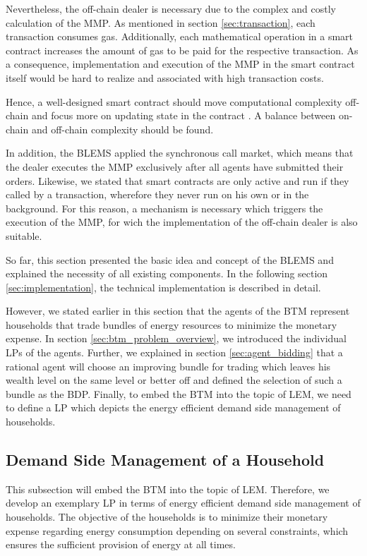 Nevertheless, the off-chain dealer is necessary due to the complex and costly calculation of the MMP.
As mentioned in section \ref{sec:transaction}, each transaction consumes gas. Additionally, each mathematical operation in a smart contract
increases the amount of gas to be paid for the respective transaction. As a consequence, implementation and execution of the MMP
in the smart contract itself would be hard to realize and associated with high transaction costs. 

Hence, a well-designed smart contract should move computational complexity off-chain
and focus more on updating state in the contract . A balance between on-chain
and off-chain complexity should be found.

In addition, the BLEMS applied the synchronous call market, which means that the dealer executes the MMP exclusively after all agents 
have submitted their orders.
Likewise, we stated that smart contracts are only active and run if they called by a transaction,
wherefore they never run on his own or in the background.
For this reason, a mechanism is necessary which triggers the execution of the 
MMP, for wich the implementation of the off-chain dealer is also suitable.

So far, this section presented the basic idea and concept of the BLEMS
and explained the necessity of all existing components. In the following section \ref{sec:implementation}, 
the technical implementation is described in detail. 

However, we stated earlier in this section that the agents of the BTM represent households
that trade bundles of energy resources to minimize the monetary expense. 
In section \ref{sec:btm_problem_overview}, we introduced the individual LPs of the agents.
Further, we explained in section \ref{sec:agent_bidding} that a rational agent will choose an improving bundle for 
trading which leaves his wealth level on the same level or better off and defined the selection of such a bundle 
as the BDP.
Finally, to embed the BTM into the topic of LEM, we need to define 
a LP which depicts the energy efficient demand side management of households.

\subsection{Demand Side Management of a Household}
This subsection will embed the BTM into the topic of LEM. 
Therefore, we develop an exemplary LP in terms of energy efficient demand side management of households. 
The objective of the households is to minimize their monetary expense regarding energy consumption depending
on several constraints, which ensures the sufficient provision of energy at all times.

